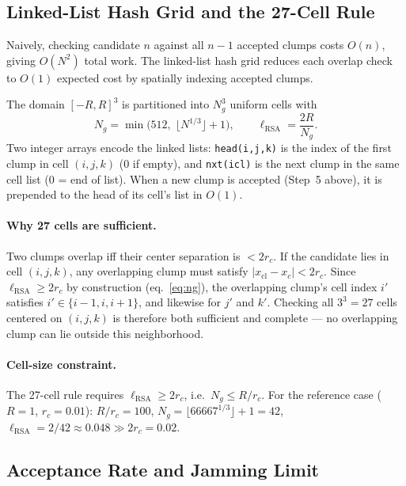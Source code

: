 \documentclass[english,a4paper]{my_memo}
\begin{document}
\subsection{Linked-List Hash Grid and the 27-Cell Rule}
\label{sec:rsa_hash}

Naively, checking candidate $n$ against all $n-1$ accepted clumps costs
$O(n)$, giving $O(N^2)$ total work.  The linked-list hash grid reduces each
overlap check to $O(1)$ expected cost by spatially indexing accepted clumps.

The domain $[-R, R]^3$ is partitioned into $N_g^3$ uniform cells with
\begin{equation}
  N_g = \min\!\bigl(512,\; \lfloor N^{1/3} \rfloor + 1\bigr),
  \qquad
  \ell_\mathrm{RSA} = \frac{2R}{N_g}.
  \label{eq:ng}
\end{equation}
Two integer arrays encode the linked lists: \texttt{head(i,j,k)} is the index
of the first clump in cell $(i,j,k)$ (0 if empty), and \texttt{nxt(icl)} is
the next clump in the same cell list (0 = end of list).  When a new clump is
accepted (Step~5 above), it is prepended to the head of its cell's list in $O(1)$.

\paragraph{Why 27 cells are sufficient.}
Two clumps overlap iff their center separation is $< 2r_c$.  If the
candidate lies in cell $(i,j,k)$, any overlapping clump must satisfy
$|x_\mathrm{cl} - x_c| < 2r_c$.  Since $\ell_\mathrm{RSA} \ge 2r_c$ by
construction (eq.~\ref{eq:ng}), the overlapping clump's cell index $i'$
satisfies $i' \in \{i-1, i, i+1\}$, and likewise for $j'$ and $k'$.
Checking all $3^3 = 27$ cells centered on $(i,j,k)$ is therefore both
sufficient and complete --- no overlapping clump can lie outside this
neighborhood.

\paragraph{Cell-size constraint.}
The 27-cell rule requires $\ell_\mathrm{RSA} \ge 2r_c$, i.e.\
$N_g \le R/r_c$.  For the reference case ($R = 1$, $r_c = 0.01$):
$R/r_c = 100$, $N_g = \lfloor 66667^{1/3}\rfloor + 1 = 42$,
$\ell_\mathrm{RSA} = 2/42 \approx 0.048 \gg 2r_c = 0.02$. \checkmark

\subsection{Acceptance Rate and Jamming Limit}
\end{document}

